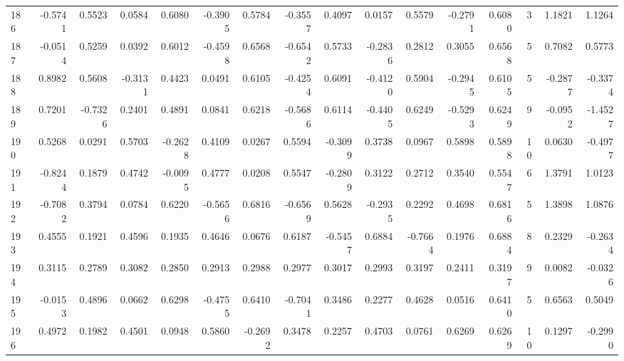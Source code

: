 \begin{tabular}{lrrrrrrrrrrrrrrr}
186 &     -0.5741 &  0.5523 &  0.0584 &  0.6080 & -0.3905 &  0.5784 & -0.3557 &  0.4097 &  0.0157 &  0.5579 &  -0.2791 &     0.6080 &      3 &                    1.1821 &                     1.1264 \\
187 &     -0.0514 &  0.5259 &  0.0392 &  0.6012 & -0.4598 &  0.6568 & -0.6542 &  0.5733 & -0.2836 &  0.2812 &   0.3055 &     0.6568 &      5 &                    0.7082 &                     0.5773 \\
188 &      0.8982 &  0.5608 & -0.3131 &  0.4423 &  0.0491 &  0.6105 & -0.4254 &  0.6091 & -0.4120 &  0.5904 &  -0.2945 &     0.6105 &      5 &                   -0.2877 &                    -0.3374 \\
189 &      0.7201 & -0.7326 &  0.2401 &  0.4891 &  0.0841 &  0.6218 & -0.5686 &  0.6114 & -0.4405 &  0.6249 &  -0.5293 &     0.6249 &      9 &                   -0.0952 &                    -1.4527 \\
190 &      0.5268 &  0.0291 &  0.5703 & -0.2628 &  0.4109 &  0.0267 &  0.5594 & -0.3099 &  0.3738 &  0.0967 &   0.5898 &     0.5898 &     10 &                    0.0630 &                    -0.4977 \\
191 &     -0.8244 &  0.1879 &  0.4742 & -0.0095 &  0.4777 &  0.0208 &  0.5547 & -0.2809 &  0.3122 &  0.2712 &   0.3540 &     0.5547 &      6 &                    1.3791 &                     1.0123 \\
192 &     -0.7082 &  0.3794 &  0.0784 &  0.6220 & -0.5656 &  0.6816 & -0.6569 &  0.5628 & -0.2935 &  0.2292 &   0.4698 &     0.6816 &      5 &                    1.3898 &                     1.0876 \\
193 &      0.4555 &  0.1921 &  0.4596 &  0.1935 &  0.4646 &  0.0676 &  0.6187 & -0.5457 &  0.6884 & -0.7664 &   0.1976 &     0.6884 &      8 &                    0.2329 &                    -0.2634 \\
194 &      0.3115 &  0.2789 &  0.3082 &  0.2850 &  0.2913 &  0.2988 &  0.2977 &  0.3017 &  0.2993 &  0.3197 &   0.2411 &     0.3197 &      9 &                    0.0082 &                    -0.0326 \\
195 &     -0.0153 &  0.4896 &  0.0662 &  0.6298 & -0.4755 &  0.6410 & -0.7041 &  0.3486 &  0.2277 &  0.4628 &   0.0516 &     0.6410 &      5 &                    0.6563 &                     0.5049 \\
196 &      0.4972 &  0.1982 &  0.4501 &  0.0948 &  0.5860 & -0.2692 &  0.3478 &  0.2257 &  0.4703 &  0.0761 &   0.6269 &     0.6269 &     10 &                    0.1297 &                    -0.2990 \\

\end{tabular}
